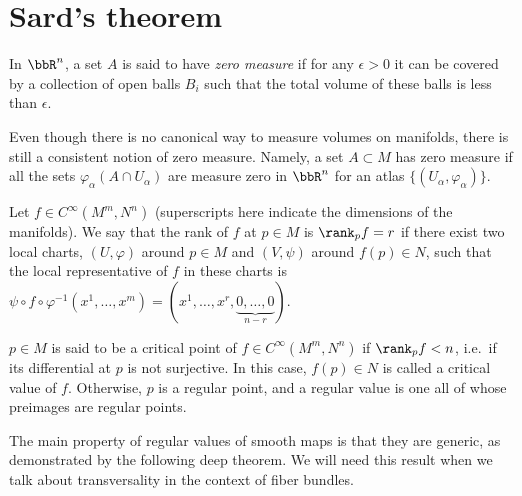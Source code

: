 \section{Sard's theorem}

In $\bbR^n$, a set $A$ is said to have\emph{ zero measure} if for any $\epsilon>0$ it can be covered by a collection of open balls $B_i$ such that the total volume of these balls is less than $\epsilon$.

\begin{defn}
    Even though there is no canonical way to measure volumes on manifolds, there is still a consistent notion of zero measure. Namely, a set $A\subset M$ has zero measure if all the sets $\varphi_\alpha(A\cap U_\alpha)$ are measure zero in $\bbR^n$ for an atlas $\{(U_\alpha,\varphi_\alpha)\}$.
\end{defn}

\begin{defn}\label{def.rank}
    Let $f\in C^\infty (M^m,N^n)$ (superscripts here indicate the dimensions of the manifolds). We say that the rank of $f$ at $p\in M$ is $\rank_p f=r$ if there exist two local charts, $(U,\varphi)$ around $p \in M$ and $(V,\psi)$ around $f(p)\in N$, such that the local representative of $f$ in these charts is $\psi\circ f\circ\varphi^{-1}(x^1,\ldots,x^m)=(x^1,\ldots,x^r,\underbrace{0,\ldots,0}_{n-r})$.
\end{defn}

\begin{defn}
    $p\in M$ is said to be a critical point of $f\in C^\infty(M^m,N^n)$ if $\rank_p f<n$, i.e.~if its differential at $p$ is not surjective. In this case, $f(p)\in N$ is called a critical value of $f$. Otherwise, $p$ is a regular point, and a regular value is one all of whose preimages are regular points.
\end{defn}

The main property of regular values of smooth maps is that they are generic, as demonstrated by the following deep theorem. We will need this result when we talk about transversality in the context of fiber bundles.


